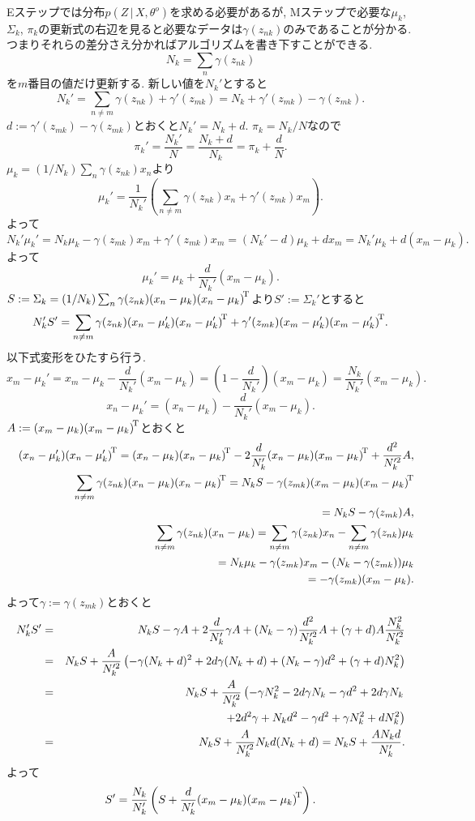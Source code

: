 Eステップでは分布$p(Z\,|\,X,\theta^o)$を求める必要があるが, Mステップで必要な$\mu_k$, $\Sigma_k$, $\pi_k$の更新式の右辺を見ると必要なデータは$\gamma(z_{nk})$のみであることが分かる. つまりそれらの差分さえ分かればアルゴリズムを書き下すことができる.
$$N_k=\sum_n \gamma(z_{nk})$$
を$m$番目の値だけ更新する. 新しい値を$N_k'$とすると
$$
N_k'=\sum_{n \ne m} \gamma(z_{nk}) + \gamma'(z_{mk})=N_k + \gamma'(z_{mk})-\gamma(z_{mk}).
$$
$d:=\gamma'(z_{mk})-\gamma(z_{mk})$とおくと$N_k'=N_k + d$.
$\pi_k=N_k/N$なので
$$
\pi_k'=\frac{N_k'}{N}=\frac{N_k+d}{N_k}=\pi_k + \frac{d}{N}.
$$
$\mu_k=(1/N_k)\sum_n \gamma(z_{nk})x_n$より
$$
\mu_k'=\frac{1}{N_k'}\left(\sum_{n \ne m}\gamma(z_{nk})x_n+\gamma'(z_{mk})x_m\right).
$$
よって
$$
N_k' \mu_k'=N_k \mu_k - \gamma(z_{mk})x_m + \gamma'(z_{mk})x_m=(N_k'-d)\mu_k+dx_m=N_k'\mu_k+d(x_m-\mu_k).
$$
よって
$$
\mu_k'=\mu_k+\frac{d}{N_k'}(x_m-\mu_k).
$$
$S:=\Sigma_k=(1/N_k)\sum_n \gamma(z_{nk})(x_n-\mu_k){(x_n-\mu_k)}^{\!\mathrm{T}}$より$S':=\Sigma_k'$とすると
$$
N_k'S'=\sum_{n \ne m}\gamma(z_{nk})(x_n-\mu_k'){(x_n-\mu_k')}^{\!\mathrm{T}}+\gamma'(z_{mk})(x_m-\mu_k'){(x_m-\mu_k')}^{\!\mathrm{T}}.
$$
以下式変形をひたすら行う.
$$
x_m-\mu_k'=x_m-\mu_k-\frac{d}{N_k'}(x_m-\mu_k)=\left(1-\frac{d}{N_k'}\right)(x_m-\mu_k)=\frac{N_k}{N_k'}(x_m-\mu_k).
$$
$$
x_n-\mu_k'=(x_n-\mu_k)-\frac{d}{N_k'}(x_m-\mu_k).
$$
$A:=(x_m-\mu_k){(x_m-\mu_k)}^{\!\mathrm{T}}$とおくと
\begin{eqnarray*}
&&\outp{(x_n-\mu_k')}=\outp{(x_n-\mu_k)}-2\frac{d}{N_k'}(x_n-\mu_k)\trans{(x_m-\mu_k)}+\frac{d^2}{N_k'^2}A,
\\
&&\sum_{n \ne m}\gamma(z_{nk})\outp{(x_n-\mu_k)}
=N_k S - \gamma(z_{mk})\outp{(x_m-\mu_k)}
\\
&&\hphantom{\sum_{n \ne m}\gamma(z_{nk})\outp{(x_n-\mu_k)}}
= N_k S -\gamma(z_{mk})A,
\\&&
\sum_{n \ne m}\gamma(z_{nk})(x_n-\mu_k)
 = \sum_{n \ne m}\gamma(z_{nk})x_n - \sum_{n \ne m}\gamma(z_{nk})\mu_k\\
&&\hphantom{\sum_{n \ne m}\gamma(z_{nk})(x_n-\mu_k)}
 = N_k \mu_k - \gamma(z_{mk})x_m-(N_k-\gamma(z_{mk}))\mu_k\\
&&\hphantom{\sum_{n \ne m}\gamma(z_{nk})(x_n-\mu_k)}
 = -\gamma(z_{mk})(x_m-\mu_k).
\end{eqnarray*}
よって$\gamma:=\gamma(z_{mk})$とおくと
\begin{eqnarray*}
N_k' S'
 &=& N_k S - \gamma A + 2\frac{d}{N_k'}\gamma A + (N_k-\gamma)\frac{d^2}{N_k'^2}A + (\gamma+d)A \frac{N_k^2}{N_k'^2}\\
 &=& N_k S + \frac{A}{N_k'^2}\left(-\gamma(N_k+d)^2+2d\gamma(N_k+d)+(N_k-\gamma)d^2+(\gamma+d)N_k^2\right)\\
 &=& N_k S + \frac{A}{N_k'^2}\left(-\gamma N_k^2-2d\gamma N_k - \gamma d^2 + 2d \gamma N_k  \right.\\
 & & \hphantom{N_k S + \frac{A}{N_k'^2}}\quad \left. + 2d^2 \gamma + N_k d^2-\gamma d^2 + \gamma N_k^2 + d N_k^2\right)\\
 &=& N_k S + \frac{A}{N_k'^2}N_k d(N_k+d) = N_k S + \frac{A N_k d}{N_k'}.
\end{eqnarray*}
よって
$$
S'=\frac{N_k}{N_k'}\left(S + \frac{d}{N_k'}(x_m-\mu_k){(x_m-\mu_k)}^{\!\mathrm{T}}\right).
$$
